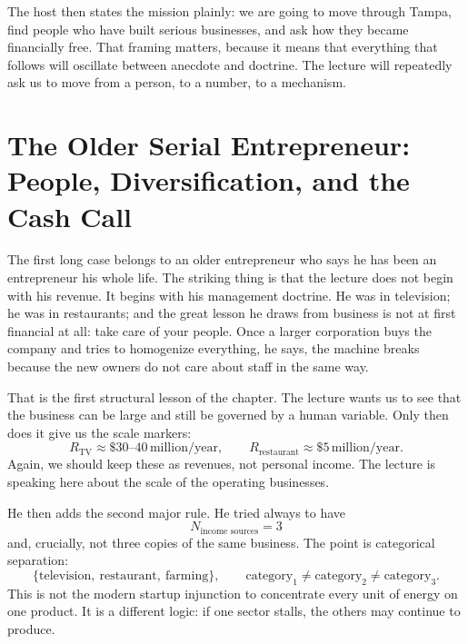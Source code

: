 The host then states the mission plainly: we are going to move through Tampa, find people who have built serious businesses, and ask how they became financially free. That framing matters, because it means that everything that follows will oscillate between anecdote and doctrine. The lecture will repeatedly ask us to move from a person, to a number, to a mechanism.

\section{The Older Serial Entrepreneur: People, Diversification, and the Cash Call}

The first long case belongs to an older entrepreneur who says he has been an entrepreneur his whole life. The striking thing is that the lecture does not begin with his revenue. It begins with his management doctrine. He was in television; he was in restaurants; and the great lesson he draws from business is not at first financial at all: take care of your people. Once a larger corporation buys the company and tries to homogenize everything, he says, the machine breaks because the new owners do not care about staff in the same way.

That is the first structural lesson of the chapter. The lecture wants us to see that the business can be large and still be governed by a human variable. Only then does it give us the scale markers:
\begin{equation}
R_{\text{TV}} \approx \$30\text{--}40\,\text{million/year},\qquad
R_{\text{restaurant}} \approx \$5\,\text{million/year}.
\end{equation}
Again, we should keep these as revenues, not personal income. The lecture is speaking here about the scale of the operating businesses.

He then adds the second major rule. He tried always to have
\begin{equation}
N_{\text{income sources}} = 3
\end{equation}
and, crucially, not three copies of the same business. The point is categorical separation:
\begin{equation}
\{\text{television},\ \text{restaurant},\ \text{farming}\},
\qquad
\text{category}_1 \neq \text{category}_2 \neq \text{category}_3.
\end{equation}
This is not the modern startup injunction to concentrate every unit of energy on one product. It is a different logic: if one sector stalls, the others may continue to produce.

